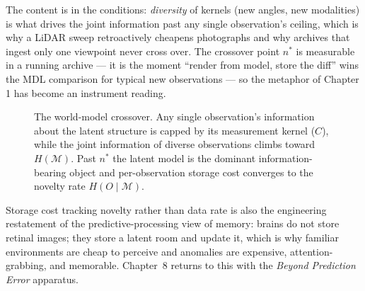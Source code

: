 \documentclass[11pt,oneside]{book}
\theoremstyle{remark}
\newcommand{\Mod}{\mathcal{M}}
\begin{document}
The content is in the conditions: \emph{diversity} of kernels (new
angles, new modalities) is what drives the joint information past any
single observation's ceiling, which is why a LiDAR sweep retroactively
cheapens photographs and why archives that ingest only one viewpoint
never cross over. The crossover point $n^\ast$ is measurable in a
running archive --- it is the moment ``render from model, store the
diff'' wins the MDL comparison for typical new observations --- so the
metaphor of Chapter 1 has become an instrument reading.

\begin{figure}[ht]
\centering
{}
\caption{The world-model crossover. Any single observation's
information about the latent structure is capped by its measurement
kernel ($C$), while the joint information of diverse observations
climbs toward $H(\Mod)$. Past $n^\ast$ the latent model is the
dominant information-bearing object and per-observation storage cost
converges to the novelty rate $H(O \mid \Mod)$.}
\label{fig:crossover}
\end{figure}

Storage cost tracking novelty rather than data rate is also the
engineering restatement of the
predictive-processing view of memory: brains do not store retinal
images; they store a latent room and update it, which is why familiar
environments are cheap to perceive and anomalies are expensive,
attention-grabbing, and memorable. Chapter~8 returns to this with the
\emph{Beyond Prediction Error} apparatus.
\end{document}

